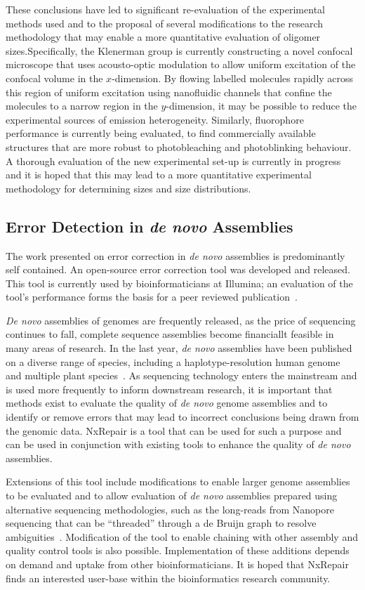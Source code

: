 These conclusions have led to significant re-evaluation of the experimental methods used and to the proposal of several modifications to the research methodology that may enable a more quantitative evaluation of oligomer sizes.Specifically, the Klenerman group is currently constructing a novel confocal microscope that uses acousto-optic modulation to allow uniform excitation of the confocal volume in the $x$-dimension. By flowing labelled molecules rapidly across this region of uniform excitation using nanofluidic channels that confine the molecules to a narrow region in the $y$-dimension, it may be possible to reduce the experimental sources of emission heterogeneity. Similarly, fluorophore performance is currently being evaluated, to find commercially available structures that are more robust to photobleaching and photoblinking behaviour. A thorough evaluation of the new experimental set-up is currently in progress and it is hoped that this may lead to a more quantitative experimental methodology for determining sizes and size distributions.

\subsection{Error Detection in \emph{de novo} Assemblies}
The work presented on error correction in \emph{de novo} assemblies is predominantly self contained. An open-source error correction tool was developed and released. This tool is currently used by bioinformaticians at Illumina; an evaluation of the tool's performance forms the basis for a peer reviewed publication~\cite{murphy2015}. 

\emph{De novo} assemblies of genomes are frequently released, as the price of sequencing continues to fall, complete sequence assemblies become financiallt feasible in many areas of research. In the last year, \emph{de novo} assemblies have been published on a diverse range of species, including a haplotype-resolution human genome~\cite{Cao2015} and multiple plant species~\cite{Xie2015, Fukushima2015}. As sequencing technology enters the mainstream and is used more frequently to inform downstream research, it is important that methods exist to evaluate the quality of \emph{de novo} genome assemblies and to identify or remove errors that may lead to incorrect conclusions being drawn from the genomic data. NxRepair is a tool that can be used for such a purpose and can be used in conjunction with existing tools to enhance the quality of \emph{de novo} assemblies.

Extensions of this tool include modifications to enable larger genome assemblies to be evaluated and to allow evaluation of \emph{de novo} assemblies prepared using alternative sequencing methodologies, such as the long-reads from Nanopore sequencing that can be ``threaded'' through a de Bruijn graph to resolve ambiguities~\cite{Koren2015}. Modification of the tool to enable chaining with other assembly and quality control tools is also possible. Implementation of these additions depends on demand and uptake from other bioinformaticians. It is hoped that NxRepair finds an interested user-base within the bioinformatics research community.
